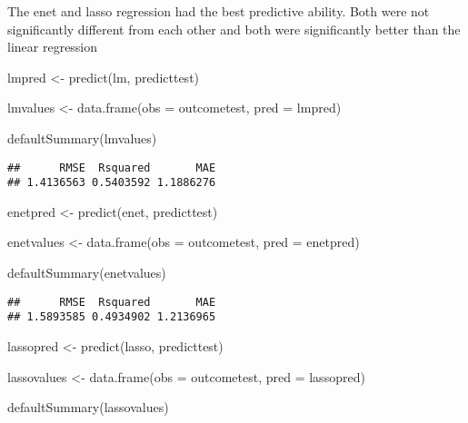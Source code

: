 \documentclass[
]{article}
\newenvironment{Shaded}{\begin{snugshade}}{\end{snugshade}}
\newcommand{\AttributeTok}[1]{\textcolor[rgb]{0.77,0.63,0.00}{#1}}
\newcommand{\FunctionTok}[1]{\textcolor[rgb]{0.00,0.00,0.00}{#1}}
\newcommand{\NormalTok}[1]{#1}
\newcommand{\OtherTok}[1]{\textcolor[rgb]{0.56,0.35,0.01}{#1}}
\begin{document}
The enet and lasso regression had the best predictive ability. Both were
not significantly different from each other and both were significantly
better than the linear regression

\begin{Shaded}
\begin{Highlighting}[]
\NormalTok{lmpred }\OtherTok{\textless{}{-}} \FunctionTok{predict}\NormalTok{(lm, predicttest)}

\NormalTok{lmvalues  }\OtherTok{\textless{}{-}} \FunctionTok{data.frame}\NormalTok{(}\AttributeTok{obs =}\NormalTok{ outcometest, }\AttributeTok{pred =}\NormalTok{ lmpred)}

\FunctionTok{defaultSummary}\NormalTok{(lmvalues)}
\end{Highlighting}
\end{Shaded}

\begin{verbatim}
##      RMSE  Rsquared       MAE 
## 1.4136563 0.5403592 1.1886276
\end{verbatim}

\begin{Shaded}
\begin{Highlighting}[]
\NormalTok{enetpred }\OtherTok{\textless{}{-}} \FunctionTok{predict}\NormalTok{(enet, predicttest)}

\NormalTok{enetvalues  }\OtherTok{\textless{}{-}} \FunctionTok{data.frame}\NormalTok{(}\AttributeTok{obs =}\NormalTok{ outcometest, }\AttributeTok{pred =}\NormalTok{ enetpred)}

\FunctionTok{defaultSummary}\NormalTok{(enetvalues)}
\end{Highlighting}
\end{Shaded}

\begin{verbatim}
##      RMSE  Rsquared       MAE 
## 1.5893585 0.4934902 1.2136965
\end{verbatim}

\begin{Shaded}
\begin{Highlighting}[]
\NormalTok{lassopred }\OtherTok{\textless{}{-}} \FunctionTok{predict}\NormalTok{(lasso, predicttest)}

\NormalTok{lassovalues  }\OtherTok{\textless{}{-}} \FunctionTok{data.frame}\NormalTok{(}\AttributeTok{obs =}\NormalTok{ outcometest, }\AttributeTok{pred =}\NormalTok{ lassopred)}

\FunctionTok{defaultSummary}\NormalTok{(lassovalues)}
\end{Highlighting}
\end{Shaded}
\end{document}

